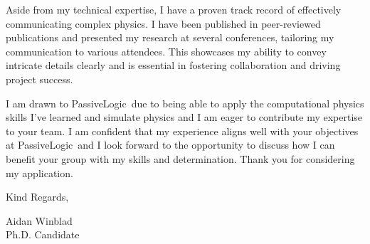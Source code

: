 \documentclass[12pt]{letter}
\newcommand{\myname}{Aidan Winblad} %
\newcommand{\mytitle}{Applicant} %
\newcommand{\closer}{Kind Regards} %
\newcommand{\company}{PassiveLogic} %
\begin{document}
Aside from my technical expertise, I have a proven track record of effectively communicating complex physics.
I have been published in peer-reviewed publications and presented my research at several conferences, tailoring my communication to various attendees.
This showcases my ability to convey intricate details clearly and is essential in fostering collaboration and driving project success.

I am drawn to \company\ due to being able to apply the computational physics skills I've learned and simulate physics and I am eager to contribute my expertise to your team.
I am confident that my experience aligns well with your objectives at \company\, and I look forward to the opportunity to discuss how I can benefit your group with my skills and determination. Thank you for considering my application.

\vspace{0.1in}
\vfill

\begin{flushleft}
\closer,

\myname\\
Ph.D. Candidate
\end{flushleft}
\end{document}
